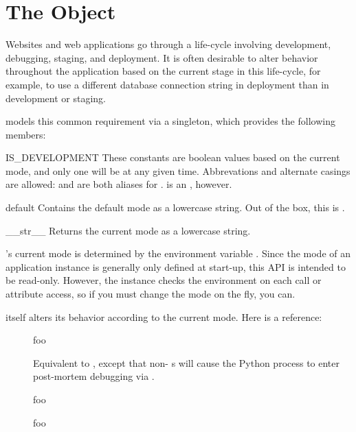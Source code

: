 \section{The  Object}

Websites and web applications go through a life-cycle involving development,
debugging, staging, and deployment. It is often desirable to alter behavior
throughout the application based on the current stage in this life-cycle, for
example, to use a different database connection string in deployment than in
development or staging.

 models this common requirement via a  singleton,
which provides the following members:

\begin{datadesc}{IS_DEVELOPMENT}
    These constants are boolean values based on the current mode, and only one
    will be  at any given time. Abbrevations and alternate casings
    are allowed:  and  are both aliases for
    .  is an ,
    however.
\end{datadesc}

\begin{datadesc}{default}
    Contains the default mode as a lowercase string. Out of the box, this is
    .
\end{datadesc}

\begin{datadesc}{__str__}
    Returns the current mode as a lowercase string.
\end{datadesc}


's current mode is determined by the environment variable
. Since the mode of an application instance is generally only
defined at start-up, this API is intended to be read-only. However, the instance
checks the environment on each call or attribute access, so if you must change
the mode on the fly, you can.

 itself alters its behavior according to the current mode. Here is
a reference:

\begin{description}

\item[]
    {foo}

\item[]
    {Equivalent to , except that non-
    s will cause the Python process to enter post-mortem
    debugging via
    .}

\item[]
    {foo}

\item[]
    {foo}

\end{description}



